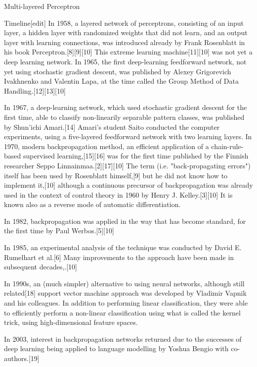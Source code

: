\documentclass[10pt]{beamer}
\begin{document}
\begin{frame}[fragile]{ Multi-layered Perceptron }

	Timeline[edit] In 1958, a layered network of perceptrons, consisting of an input layer, a hidden layer with
	randomized weights that did not learn, and an output layer with learning connections, was introduced already by
	Frank Rosenblatt in his book Perceptron.[8][9][10] This extreme learning machine[11][10] was not yet a deep
	learning network. In 1965, the first deep-learning feedforward network, not yet using stochastic gradient
	descent, was published by Alexey Grigorevich Ivakhnenko and Valentin Lapa, at the time called the Group Method
	of Data Handling.[12][13][10]

	In 1967, a deep-learning network, which used stochastic gradient descent for the first time, able to classify
	non-linearily separable pattern classes, was published by Shun'ichi Amari.[14] Amari's student Saito conducted
	the computer experiments, using a five-layered feedforward network with two learning layers. In 1970, modern
	backpropagation method, an efficient application of a chain-rule-based supervised learning,[15][16] was for the
	first time published by the Finnish researcher Seppo Linnainmaa.[2][17][10] The term (i.e. "back-propagating
	errors") itself has been used by Rosenblatt himself,[9] but he did not know how to implement it,[10] although a
	continuous precursor of backpropagation was already used in the context of control theory in 1960 by Henry J.
	Kelley.[3][10] It is known also as a reverse mode of automatic differentiation.

	In 1982, backpropagation was applied in the way that has become standard, for the first time by Paul
	Werbos.[5][10]

	In 1985, an experimental analysis of the technique was conducted by David E. Rumelhart et al.[6] Many
	improvements to the approach have been made in subsequent decades,.[10]

	In 1990s, an (much simpler) alternative to using neural networks, although still related[18] support vector
	machine approach was developed by Vladimir Vapnik and his colleagues. In addition to performing linear
	classification, they were able to efficiently perform a non-linear classification using what is called the
	kernel trick, using high-dimensional feature spaces.

	In 2003, interest in backpropagation networks returned due to the successes of deep learning being applied to
	language modelling by Yoshua Bengio with co-authors.[19]


\end{frame}
\end{document}
